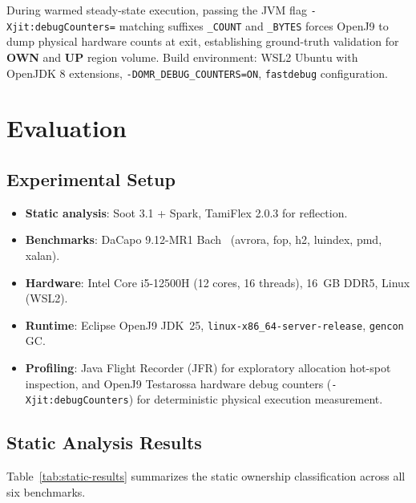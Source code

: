 \documentclass[12pt,a4paper]{article}
\newcommand{\OWN}{\textbf{OWN}}
\newcommand{\UP}{\textbf{UP}}
\begin{document}
During warmed steady-state execution, passing the JVM flag \texttt{-Xjit:debugCounters=} matching suffixes \texttt{\_COUNT} and \texttt{\_BYTES} forces OpenJ9 to dump physical hardware counts at exit, establishing ground-truth validation for \OWN{} and \UP{} region volume. Build environment: WSL2 Ubuntu with OpenJDK 8 extensions, \texttt{-DOMR\_DEBUG\_COUNTERS=ON}, \texttt{fastdebug} configuration.

\section{Evaluation}
\label{sec:evaluation}

\subsection{Experimental Setup}

\begin{itemize}
  \item \textbf{Static analysis}: Soot 3.1 + Spark, TamiFlex 2.0.3 for reflection.
  \item \textbf{Benchmarks}: DaCapo 9.12-MR1 Bach~\cite{dacapo2006} (avrora, fop, h2, luindex, pmd, xalan).
  \item \textbf{Hardware}: Intel Core i5-12500H (12 cores, 16 threads), 16~GB DDR5, Linux (WSL2).
  \item \textbf{Runtime}: Eclipse OpenJ9 JDK~25, \texttt{linux-x86\_64-server-release}, \texttt{gencon} GC.
  \item \textbf{Profiling}: Java Flight Recorder (JFR) for exploratory allocation hot-spot inspection, and OpenJ9 Testarossa hardware debug counters (\texttt{-Xjit:}\allowbreak\texttt{debugCounters}) for deterministic physical execution measurement.
\end{itemize}

\subsection{Static Analysis Results}

Table~\ref{tab:static-results} summarizes the static ownership classification across all six benchmarks.
\end{document}
